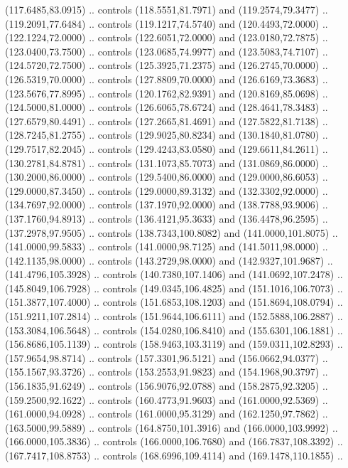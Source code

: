   (117.6485,83.0915) .. controls (118.5551,81.7971) and (119.2574,79.3477) ..
  (119.2091,77.6484) .. controls (119.1217,74.5740) and (120.4493,72.0000) ..
  (122.1224,72.0000) .. controls (122.6051,72.0000) and (123.0180,72.7875) ..
  (123.0400,73.7500) .. controls (123.0685,74.9977) and (123.5083,74.7107) ..
  (124.5720,72.7500) .. controls (125.3925,71.2375) and (126.2745,70.0000) ..
  (126.5319,70.0000) .. controls (127.8809,70.0000) and (126.6169,73.3683) ..
  (123.5676,77.8995) .. controls (120.1762,82.9391) and (120.8169,85.0698) ..
  (124.5000,81.0000) .. controls (126.6065,78.6724) and (128.4641,78.3483) ..
  (127.6579,80.4491) .. controls (127.2665,81.4691) and (127.5822,81.7138) ..
  (128.7245,81.2755) .. controls (129.9025,80.8234) and (130.1840,81.0780) ..
  (129.7517,82.2045) .. controls (129.4243,83.0580) and (129.6611,84.2611) ..
  (130.2781,84.8781) .. controls (131.1073,85.7073) and (131.0869,86.0000) ..
  (130.2000,86.0000) .. controls (129.5400,86.0000) and (129.0000,86.6053) ..
  (129.0000,87.3450) .. controls (129.0000,89.3132) and (132.3302,92.0000) ..
  (134.7697,92.0000) .. controls (137.1970,92.0000) and (138.7788,93.9006) ..
  (137.1760,94.8913) .. controls (136.4121,95.3633) and (136.4478,96.2595) ..
  (137.2978,97.9505) .. controls (138.7343,100.8082) and (141.0000,101.8075) ..
  (141.0000,99.5833) .. controls (141.0000,98.7125) and (141.5011,98.0000) ..
  (142.1135,98.0000) .. controls (143.2729,98.0000) and (142.9327,101.9687) ..
  (141.4796,105.3928) .. controls (140.7380,107.1406) and (141.0692,107.2478) ..
  (145.8049,106.7928) .. controls (149.0345,106.4825) and (151.1016,106.7073) ..
  (151.3877,107.4000) .. controls (151.6853,108.1203) and (151.8694,108.0794) ..
  (151.9211,107.2814) .. controls (151.9644,106.6111) and (152.5888,106.2887) ..
  (153.3084,106.5648) .. controls (154.0280,106.8410) and (155.6301,106.1881) ..
  (156.8686,105.1139) .. controls (158.9463,103.3119) and (159.0311,102.8293) ..
  (157.9654,98.8714) .. controls (157.3301,96.5121) and (156.0662,94.0377) ..
  (155.1567,93.3726) .. controls (153.2553,91.9823) and (154.1968,90.3797) ..
  (156.1835,91.6249) .. controls (156.9076,92.0788) and (158.2875,92.3205) ..
  (159.2500,92.1622) .. controls (160.4773,91.9603) and (161.0000,92.5369) ..
  (161.0000,94.0928) .. controls (161.0000,95.3129) and (162.1250,97.7862) ..
  (163.5000,99.5889) .. controls (164.8750,101.3916) and (166.0000,103.9992) ..
  (166.0000,105.3836) .. controls (166.0000,106.7680) and (166.7837,108.3392) ..
  (167.7417,108.8753) .. controls (168.6996,109.4114) and (169.1478,110.1855) ..
